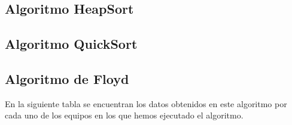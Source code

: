 \documentclass{homework}
\begin{document}
    \subsection{Algoritmo HeapSort}
    \subsection{Algoritmo QuickSort}
    
    \newpage 
    
    \subsection{Algoritmo de Floyd}

    En la siguiente tabla se encuentran los datos obtenidos en este algoritmo por cada uno de los
    equipos en los que hemos ejecutado el algoritmo. 
\end{document}
